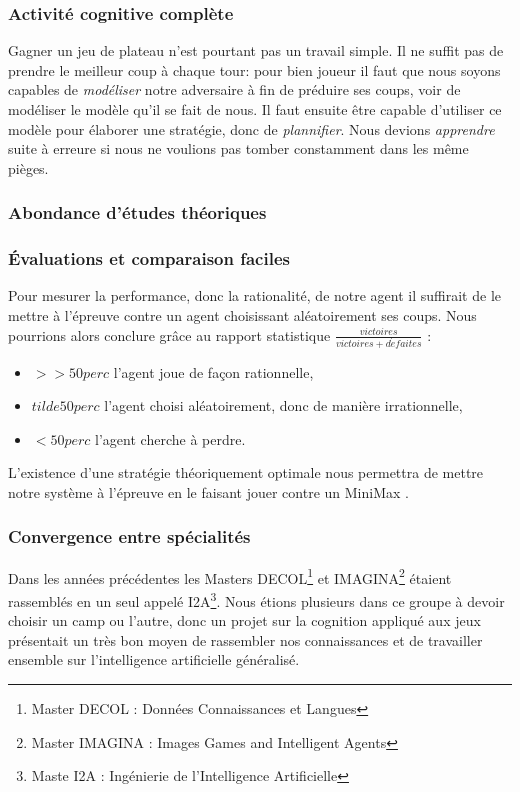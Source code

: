\subsubsection{Activité cognitive complète}
Gagner un jeu de plateau n'est pourtant pas un travail simple. Il ne suffit pas de prendre le \og meilleur \fg{} coup à chaque tour: pour bien joueur il faut que nous soyons capables de \emph{modéliser} notre adversaire à fin de préduire ses coups, voir de modéliser le modèle qu'il se fait de nous. Il faut ensuite être capable d'utiliser ce modèle pour élaborer une stratégie, donc de \emph{plannifier}. Nous devions \emph{apprendre} suite à erreure si nous ne voulions pas tomber constamment dans les même pièges. 

\subsubsection{Abondance d'études théoriques}

\subsubsection{Évaluations et comparaison faciles}
Pour mesurer la performance, donc la rationalité, de notre agent il suffirait de le mettre à l'épreuve contre un agent choisissant aléatoirement ses coups. Nous pourrions alors conclure grâce au rapport statistique $\frac{victoires}{victoires + d\acute{e}faites}$ :
\begin{itemize}
\item $>> 50 perc$ l'agent joue de façon rationnelle, 
\item $tilde 50 perc$ l'agent choisi aléatoirement, donc de manière irrationnelle,
\item $< 50 perc$ l'agent cherche à perdre.
\end{itemize}
L'existence d'une stratégie théoriquement optimale nous permettra de mettre notre système à l'épreuve en le faisant jouer contre un \og MiniMax \fg{}. 


\subsubsection{Convergence entre spécialités }
Dans les années précédentes les Masters DECOL\footnote{ Master DECOL : \og Données Connaissances et Langues \fg{} } et IMAGINA\footnote{ Master IMAGINA : \og Images Games and Intelligent Agents \fg{} } étaient rassemblés en un seul appelé I2A\footnote { Maste I2A : \og Ingénierie de l'Intelligence Artificielle \fg{} }.
Nous étions plusieurs dans ce groupe à devoir choisir un camp ou l'autre, donc un projet sur la cognition appliqué aux jeux présentait un très bon moyen de rassembler nos connaissances et de travailler ensemble sur l'intelligence artificielle généralisé.